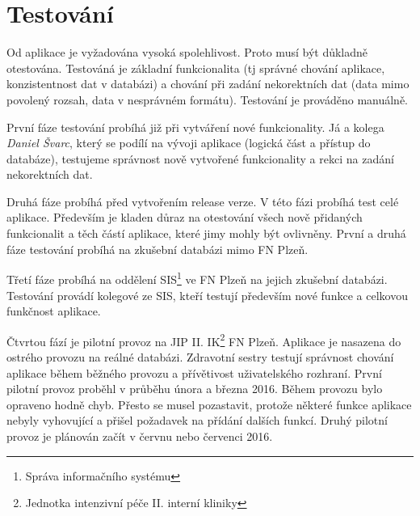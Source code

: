 \chapter{Testování}

Od aplikace je vyžadována vysoká spolehlivost. Proto musí být důkladně otestována. Testováná je základní funkcionalita (tj správné chování aplikace, konzistentnost dat v databázi) a chování při zadání nekorektních dat (data mimo povolený rozsah, data v nesprávném formátu). Testování je prováděno manuálně.

První fáze testování probíhá již při vytváření nové funkcionality. Já a kolega \emph{Daniel Švarc}, který se podílí na vývoji aplikace (logická část a přístup do databáze), testujeme správnost nově vytvořené funkcionality a rekci na zadání nekorektních dat.

Druhá fáze probíhá před vytvořením release verze. V této fázi probíhá test celé aplikace. Především je kladen důraz na otestování všech nově přidaných funkcionalit a těch částí aplikace, které jimy mohly být ovlivněny. První a druhá fáze testování probíhá na zkušební databázi mimo FN Plzeň.

Třetí fáze probíhá na oddělení SIS\footnote{Správa informačního systému} ve FN Plzeň na jejich zkušební databázi. Testování provádí kolegové ze SIS, kteří testují především nové funkce a celkovou funkčnost aplikace.

Čtvrtou fází je pilotní provoz na JIP II. IK\footnote{Jednotka intenzivní péče II. interní kliniky} FN Plzeň. Aplikace je nasazena do ostrého provozu na reálné databázi. Zdravotní sestry testují správnost chování aplikace během běžného provozu a přívětivost uživatelského rozhraní. První pilotní provoz proběhl v průběhu února a března 2016. Během provozu bylo opraveno hodně chyb. Přesto se musel pozastavit, protože některé funkce aplikace nebyly vyhovující a přišel požadavek na přídání dalších funkcí. Druhý pilotní provoz je plánován začít v červnu nebo červenci 2016.